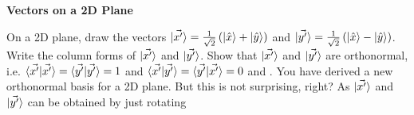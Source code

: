 \documentclass[a4paper, 10pt]{article}
\begin{document}
\begin{problem}
\textbf{Vectors on a 2D Plane}
\par On a 2D plane, draw the vectors \( \ket{\vec{x^\prime}} = \frac{1}{\sqrt{2}}\left( \ket{\hat{x}} + \ket{\hat{y}} \right) \) and \( \ket{\vec{y^\prime}} = \frac{1}{\sqrt{2}}\left( \ket{\hat{x}} - \ket{\hat{y}} \right) \).
Write the column forms of \( \ket{\vec{x^\prime}} \) and \( \ket{\vec{y^\prime}} \).
Show that \( \ket{\vec{x^\prime}} \) and \( \ket{\vec{y^\prime}} \) are orthonormal,
i.e. \( \braket{\vec{x^\prime}|\vec{x^\prime}} = \braket{\vec{y^\prime}|\vec{y^\prime}} = 1 \)
and \( \braket{\vec{x^\prime}|\vec{y^\prime}} = \braket{\vec{y^\prime}|\vec{x^\prime}} = 0 \) and .
You have derived a new orthonormal basis for a 2D plane.
But this is not surprising, right?
As \( \ket{\vec{x^\prime}} \) and \( \ket{\vec{y^\prime}} \) can be obtained by just rotating
\end{problem}
\end{document}
